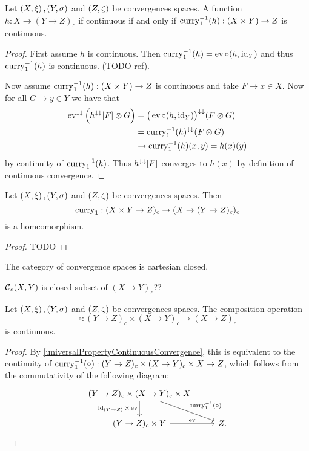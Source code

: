 \begin{proposition} \label{universalPropertyContinuousConvergence}
Let $\left( X, \xi \right), \left( Y,\sigma \right)$ and $\left( Z,\zeta \right)$ be convergences spaces. A function $h: X\to (Y \to Z)_c$ if continuous \textup{if and only if} $\operatorname{curry}_1^{-1}(h): (X\times Y)\to Z$ is continuous.
\end{proposition}
\begin{proof}
First assume $h$ is continuous. Then $\operatorname{curry}_1^{-1}(h) = \operatorname{ev} \circ (h,\operatorname{id}_Y)$ and thus $\operatorname{curry}_1^{-1}(h)$ is continuous. (TODO ref).

Now assume $\operatorname{curry}_1^{-1}(h): (X\times Y)\to Z$ is continuous and take $F\to x\in X$. Now for all $G\to y\in Y$ we have that
\begin{align*}
\operatorname{ev}^{\downarrow\downarrow}\Big(h^{\downarrow\downarrow}[F]\otimes G\Big) &= \big(\operatorname{ev} \circ (h,\operatorname{id}_Y)\big)^{\downarrow\downarrow}(F\otimes G) \\
&= \operatorname{curry}_1^{-1}(h)^{\downarrow\downarrow}(F\otimes G) \\
&\to \operatorname{curry}_1^{-1}(h)(x,y) = h(x)(y)
\end{align*}
by continuity of $\operatorname{curry}_1^{-1}(h)$. Thus $h^{\downarrow\downarrow}[F]$ converges to $h(x)$ by definition of continuous convergence.
\end{proof}

\begin{proposition}
Let $\left( X, \xi \right), \left( Y,\sigma \right)$ and $\left( Z,\zeta \right)$ be convergences spaces. Then
\[ \operatorname{curry}_1: (X\times Y \to Z)_c \to (X\to (Y\to Z)_c)_c \]
is a homeomorphism.
\end{proposition}
\begin{proof}
TODO
\end{proof}
\begin{corollary}
The category of convergence spaces is cartesian closed.
\end{corollary}

\begin{proposition}
$\operatorname{\mathcal{C}}_c(X,Y)$ is closed subset of $(X\to Y)_c$??
\end{proposition}

\begin{proposition}
Let $\left( X, \xi \right), \left( Y,\sigma \right)$ and $\left( Z,\zeta \right)$ be convergences spaces. The composition operation
\[ \circ: (Y\to Z)_c \times (X\to Y)_c \to (X\to Z)_c \]
is continuous.
\end{proposition}
\begin{proof}
By \ref{universalPropertyContinuousConvergence}, this is equivalent to the continuity of $\operatorname{curry}_1^{-1}(\circ): (Y\to Z)_c \times (X\to Y)_c \times X \to Z$, which follows from the commutativity of the following diagram:
\[\begin{tikzcd}
(Y\to Z)_c \times (X\to Y)_c \times X \ar[d, swap, "\id_{(Y\to Z)}\times \evalMap"] \ar[dr, "\curry_1^{-1}(\circ)"] & \\
(Y\to Z)_c\times Y \ar[r, "\evalMap"] & Z.
\end{tikzcd} \]
\end{proof}


